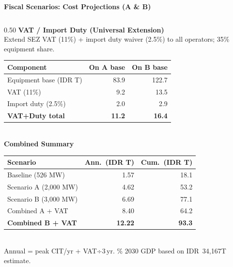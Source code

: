 \documentclass[aspectratio=169,10pt]{beamer}
\begin{document}
\begin{frame}{\textbf{Fiscal Scenarios: Cost Projections (A \& B)}}
\begin{columns}[T]
  \begin{column}{0.50\textwidth}
    {\small\color{navyblue}\textbf{VAT / Import Duty (Universal Extension)}}\\[3pt]
    {\scriptsize Extend SEZ VAT (11\%) + import duty waiver (2.5\%) to all operators; 35\% equipment share.}\\[5pt]
    {\scriptsize
    \begin{tabular}{lrr}
      \toprule
      \rowcolor{navyblue}\color{white}\textbf{Component} & \color{white}\textbf{On A base} & \color{white}\textbf{On B base} \\
      \midrule
      \rowcolor{lightgray} Equipment base (IDR T) & 83.9 & 122.7 \\
      VAT (11\%)             & 9.2 & 13.5 \\
      \rowcolor{lightgray} Import duty (2.5\%)    & 2.0 &  2.9 \\
      \midrule
      \rowcolor{navyblue}\color{white}\textbf{VAT+Duty total} & \color{white}\textbf{11.2} & \color{white}\textbf{16.4} \\
      \bottomrule
    \end{tabular}
    }\\[6pt]

    {\small\color{navyblue}\textbf{Combined Summary}}\\[2pt]
    {\scriptsize
    \begin{tabular}{lrr}
      \toprule
      \rowcolor{navyblue}\color{white}\textbf{Scenario} & \color{white}\textbf{Ann.\ (IDR T)} & \color{white}\textbf{Cum.\ (IDR T)} \\
      \midrule
      \rowcolor{lightgray} Baseline (526 MW)        & 1.57  & 18.1 \\
      Scenario A (2,000 MW)    & 4.62  & 53.2 \\
      \rowcolor{lightgray} Scenario B (3,000 MW)    & 6.69  & 77.1 \\
      Combined A + VAT         & 8.40  & 64.2 \\
      \rowcolor{navyblue}\color{white}\textbf{Combined B + VAT} & \color{white}\textbf{12.22} & \color{white}\textbf{93.3} \\
      \bottomrule
    \end{tabular}
    }\\[4pt]
    {\scriptsize\color{midgray}Annual = peak CIT/yr + VAT÷3\,yr. \% 2030 GDP based on IDR~34,167T estimate.}
  \end{column}
\end{columns}
\end{frame}
\end{document}
